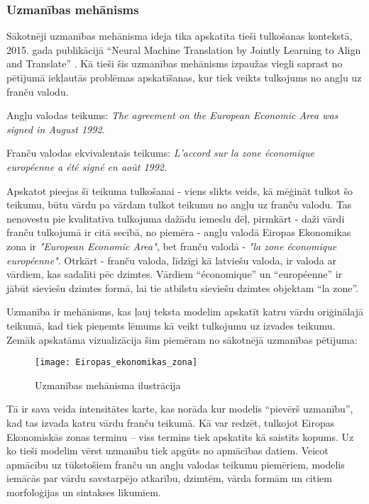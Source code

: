 \subsubsection{Uzmanības mehānisms}
Sākotnēji uzmanības mehānisma ideja tika apskatīta tieši tulkošanas kontekstā, 2015. gada publikācijā “Neural Machine Translation by Jointly Learning to Align and Translate” \cite{bahdanau2016neural}. Kā tieši šis uzmanības mehānisms izpaužas viegli saprast no pētījumā iekļautās problēmas apskatīšanas, kur tiek veikts tulkojums no angļu uz franču valodu.


\noindent Angļu valodas teikums: \textit{The agreement on the European Economic Area was signed in August 1992.}


\noindent Franču valodas ekvivalentais teikums: \textit{L’accord sur la zone économique européenne a été signé en août 1992.}

Apskatot pieejas šī teikuma tulkošanai - viens slikts veids, kā mēģināt tulkot šo teikumu, būtu vārdu pa vārdam tulkot teikumu no angļu uz franču valodu. Tas nenovestu pie kvalitatīva tulkojuma dažādu iemeslu dēļ, pirmkārt - daži vārdi franču tulkojumā ir citā secībā, no piemēra - angļu valodā Eiropas Ekonomikas zona ir \textit{"European Economic Area"}, bet franču valodā - \textit{"la zone économique européenne"}. Otrkārt - franču valoda, līdzīgi kā latviešu valoda, ir valoda ar vārdiem, kas sadalīti pēc dzimtes. Vārdiem “économique” un “européenne” ir jābūt sieviešu dzimtes formā, lai tie atbilstu sieviešu dzimtes objektam “la zone”.

Uzmanība ir mehānisms, kas ļauj teksta modelim apskatīt katru vārdu oriģinālajā teikumā, kad tiek pieņemts lēmums kā veikt tulkojumu uz izvades teikumu. Zemāk apskatāma vizualizācija šim piemēram no sākotnējā uzmanības pētījuma:

\begin{figure}[H]
\texttt{[image: Eiropas\_ekonomikas\_zona]}
\caption{Uzmanības mehānisma ilustrācija \cite{bahdanau2016neural}}
\label{fig:Eiropas_ekonomikas_zona}
\end{figure}

Tā ir sava veida intensitātes karte, kas norāda kur modelis “pievērš uzmanību”, kad tas izvada katru vārdu franču teikumā. Kā var redzēt, tulkojot Eiropas Ekonomiskās zonas terminu – viss termins tiek apskatīts kā saistīts kopums. Uz ko tieši modelim vērst uzmanību tiek apgūts no apmācības datiem. Veicot apmācību uz tūkstošiem franču un angļu valodas teikumu piemēriem, modelis iemācās par vārdu savstarpējo atkarību, dzimtēm, vārda formām un citiem morfoloģijas un sintakses likumiem. 

